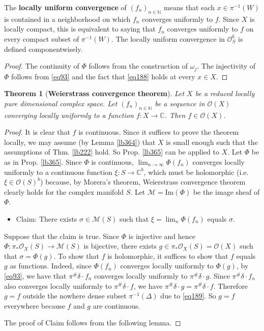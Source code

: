 \documentclass[12pt,b5paper,notitlepage]{report}
\theoremstyle{definition}
\theoremstyle{plain}
\newtheorem{thm}[df]{Theorem}
\newcommand{\scr}{\mathscr}
\newcommand{\Cbb}{\mathbb C}
\newcommand{\Nbb}{\mathbb N}
\newcommand{\Imag}{\mathrm{Im}}
\numberwithin{equation}{section}
\begin{document}
The \textbf{locally uniform convergence}   of $(f_n)_{n\in\Nbb}$ means that each $x\in \pi^{-1}(W)$ is contained in a neighborhood on which $f_n$ converges uniformly to $f$. Since $X$ is locally compact, this is equivalent to saying that $f_n$ converges uniformly to $f$ on every compact subset of $\pi^{-1}(W)$. The locally uniform convergence in $\scr O_S^b$ is defined componentwisely.

\begin{proof}
The continuity of $\Phi$ follows from the construction of $\omega_j$. The injectivity of $\Phi$ follows from \eqref{eq93} and the fact that \eqref{eq188} holds at every $x\in X$.
\end{proof}



\begin{thm}[\textbf{Weierstrass convergence theorem}]\label{lb366}
Let $X$ be a reduced locally pure dimensional complex space. Let $(f_n)_{n\in\Nbb}$ be a sequence in $\scr O(X)$ converging locally uniformly to a function $f:X\rightarrow\Cbb$. Then $f\in \scr O(X)$.
\end{thm}



\begin{proof}
It is clear that $f$ is continuous. Since it suffices to prove the theorem locally, we may assume (by Lemma \ref{lb364}) that $X$ is small enough such that the assumptions of Thm. \ref{lb222} hold. So Prop. \ref{lb365} can be applied to $X$. Let $\Phi$ be as in Prop. \ref{lb365}. Since $\Phi$ is continuous, $\lim_{n\rightarrow\infty}\Phi(f_n)$ converges locally uniformly to a continuous function $\xi:S\rightarrow\Cbb^b$, which must be holomorphic (i.e. $\xi\in\scr O(S)^b$) because, by Morera's theorem, Weierstrass convergence theorem clearly holds for the complex manifold $S$. Let $\scr M=\Imag(\Phi)$ be the image sheaf of $\Phi$. %
\begin{itemize}
\item Claim: There exists $\sigma\in \scr M(S)$ such that $\xi=\lim_n \Phi(f_n)$ equals $\sigma$. 
\end{itemize}
Suppose that the claim is true. Since $\Phi$ is injective and hence $\Phi:\pi_*\scr O_X(S)\rightarrow\scr M(S)$ is bijective, there exists $g\in\pi_*\scr O_X(S)=\scr O(X)$ such that $\sigma=\Phi(g)$. To show that $f$ is holomorphic, it suffices to show that $f$ equals $g$ as functions. Indeed, since $\Phi(f_n)$ converges locally uniformly to $\Phi(g)$, by \eqref{eq93}, we have that $\pi^\#\delta\cdot f_n$ converges locally uniformly to $\pi^\#\delta\cdot g$. Since $\pi^\#\delta\cdot f_n$ also converges locally uniformly to $\pi^\#\delta\cdot f$, we have $\pi^\#\delta\cdot g=\pi^\#\delta\cdot f$. Therefore $g=f$ outside the nowhere dense subset $\pi^{-1}(\Delta)$ due to \eqref{eq189}. So $g=f$ everywhere because $f$ and $g$ are continuous.

The proof of Claim follows from the following lemma.
\end{proof}
\end{document}
